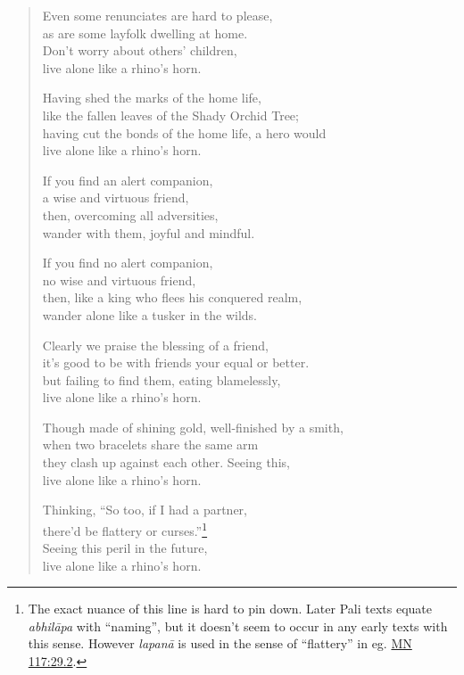 \documentclass[12pt,openany]{book}%
\begin{document}
\begin{verse}
Even some renunciates are hard to please, \\
as are some layfolk dwelling at home. \\
Don’t worry about others’ children, \\
live alone like a rhino’s horn. 

Having shed the marks of the home life, \\
like the fallen leaves of the Shady Orchid Tree; \\
having cut the bonds of the home life, a hero would \\
live alone like a rhino’s horn. 

If you find an alert companion, \\
a wise and virtuous friend, \\
then, overcoming all adversities, \\
wander with them, joyful and mindful. 

If you find no alert companion, \\
no wise and virtuous friend, \\
then, like a king who flees his conquered realm, \\
wander alone like a tusker in the wilds. 

Clearly we praise the blessing of a friend, \\
it’s good to be with friends your equal or better. \\
but failing to find them, eating blamelessly, \\
live alone like a rhino’s horn. 

Though made of shining gold, well-finished by a smith, \\
when two bracelets share the same arm \\
they clash up against each other. Seeing this, \\
live alone like a rhino’s horn. 

Thinking, “So too, if I had a partner, \\
there’d be flattery or curses.”\footnote{The exact nuance of this line is hard to pin down. Later Pali texts equate \textit{\textsanskrit{abhilāpa}} with “naming”, but it doesn’t seem to occur in any early texts with this sense. However \textit{\textsanskrit{lapanā}} is used in the sense of “flattery” in eg. \href{https://suttacentral.net/mn117/en/sujato\#29.2}{MN 117:29.2}. } \\
Seeing this peril in the future, \\
live alone like a rhino’s horn. 


\end{verse}
\end{document}
